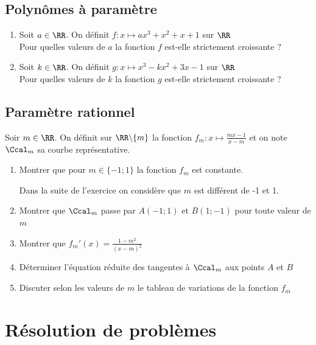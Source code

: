 \documentclass[oneside,12pt]{book}          %
\begin{document}
\subsection{Polynômes à paramètre}
\begin{enumerate}
	\item Soit $a\in\RR$. On définit $f:x\mapsto ax^3+x^2+x+1$ sur $\RR$ \\
	Pour quelles valeurs de $a$ la fonction $f$ est-elle strictement croissante ?
	
	\item Soit $k\in\RR$. On définit $g:x\mapsto x^3-kx^2+3x-1$ sur $\RR$ \\
	Pour quelles valeurs de $k$ la fonction $g$ est-elle strictement croissante ?
\end{enumerate}



\subsection{Paramètre rationnel}

Soir $m\in\RR$. On définit sur $\RR\backslash\{m\}$ la fonction $f_m:x\mapsto\frac{mx-1}{x-m}$ et on note $\Ccal_m$ sa courbe représentative.

\begin{enumerate}
	\item Montrer que pour $m\in\{-1;1\}$ la fonction $f_m$ est constante.
	
	Dans la suite de l'exercice on considère que $m$ est différent de -1 et 1.
	\item Montrer que $\Ccal_m$ passe par $A(-1;1)$ et $B(1;-1)$ pour toute valeur de $m$
	\item Montrer que $f_m'(x)=\frac{1-m^2}{(x-m)^2}$
	\item Déterminer l'équation réduite des tangentes à $\Ccal_m$ aux points $A$ et $B$
	\item Discuter selon les valeurs de $m$ le tableau de variations de la fonction $f_m$
\end{enumerate}



\section{Résolution de problèmes}
\end{document}
